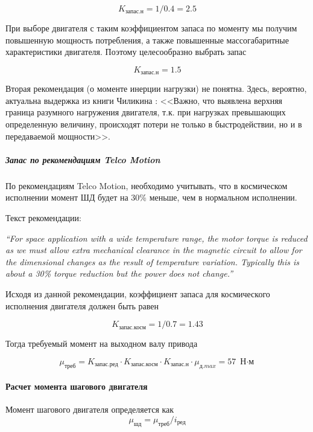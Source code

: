 $$
    K_\textit{запас.н} = 1 / 0.4 = 2.5
$$

При выборе двигателя с таким коэффициентом запаса по моменту мы получим повышенную
мощность потребления, а также повышенные массогабаритные характеристики двигателя.
Поэтому целесообразно выбрать запас

$$
    K_\textit{запас.н} = 1.5
$$

Вторая рекомендация (о моменте инерции нагрузки) не понятна. Здесь, вероятно,
актуальна выдержка из книги Чиликина \cite{Chilikin}: <<Важно, что выявлена верхняя
граница разумного нагружения двигателя, т.к. при нагрузках превышающих определенную
величину, происходят потери не только в быстродействии, но и в передаваемой мощности>>.

\subparagraph{Запас по рекомендациям \foreignlanguage{english}{Telco Motion}}
По рекомендациям \foreignlanguage{english}{Telco Motion}, необходимо учитывать, что в космическом исполнении
момент ШД будет на 30\% меньше, чем в нормальном исполнении.

Текст рекомендации:
\begin{otherlanguage}{english}
    \textit{``For space application with a wide temperature range, the motor torque is reduced
    as we must allow extra mechanical clearance in the magnetic circuit to allow for
    the dimensional changes as the result of temperature variation. Typically this
    is about a 30\% torque reduction but the power does not change.''}
\end{otherlanguage}

Исходя из данной рекомендации, коэффициент запаса для космического исполнения
двигателя должен быть равен

$$
    K_\textit{запас.косм} = 1 / 0.7 = 1.43
$$

Тогда требуемый момент на выходном валу привода

$$
    \mu_\textit{треб} =
                K_\textit{запас.ред} \cdot K_\textit{запас.косм}
                \cdot K_\textit{запас.н} \cdot \mu_\textit{д.max}
                = 57 \text{ Н$\cdot$м}
$$

\paragraph{Расчет момента шагового двигателя}

Момент шагового двигателя определяется как
\begin{equation}
    \mu_\textit{шд} = \mu_\textit{треб} / i_\text{ред}
    \label{stepper_engine_torque}
\end{equation}


